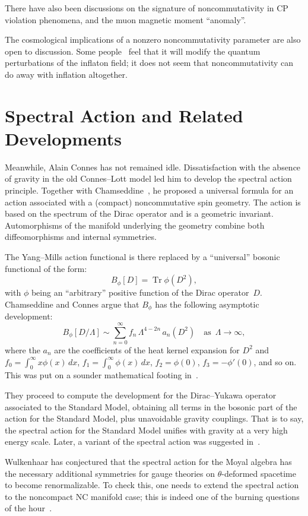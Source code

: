 \documentclass[a4paper,12pt]{article}
\newcommand{\as}{\quad\text{as}\enspace} %
\newcommand{\La}{\Lambda}           %
\DeclareMathOperator{\Tr}{Tr}       %
\newcommand{\1}{\mathbf{1}}         %
\newcommand{\7}{\dagger}            %
\newcommand{\8}{\bullet}            %
\renewcommand{\.}{\cdot}            %
\renewcommand{\:}{\colon}           %
\begin{document}
There have also been discussions on the signature of noncommutativity
in CP violation phenomena, and the muon magnetic moment ``anomaly''.

The cosmological implications of a nonzero noncommutativity parameter
are also open to discussion. Some people~\cite{ChuGS,LizziMMP} feel
that it will modify the quantum perturbations of the inflaton field;
it does not seem that noncommutativity can do away with inflation
altogether.


\section{Spectral Action and Related Developments}

Meanwhile, Alain Connes has not remained idle. Dissatisfaction with
the absence of gravity in the old Connes--Lott model led him to
develop the spectral action principle. Together with
Chamseddine~\cite{ChamseddineCSpec}, he proposed a universal formula
for an action associated with a (compact) noncommutative spin geometry. The
action is based on the spectrum of the Dirac operator and is a
geometric invariant. Automorphisms of the manifold underlying the
geometry combine both diffeomorphisms and internal symmetries.

The Yang--Mills action functional is there replaced by a ``universal''
bosonic functional of the form:
$$
B_\phi[D] = \Tr \phi(D^2),
$$
with $\phi$ being an ``arbitrary'' positive function of the Dirac
operator~$D$. Chamseddine and Connes argue that $B_\phi$ has the
following asymptotic development:
$$
B_\phi[D/\La] \sim \sum_{n=0}^\infty f_n\, \La^{4-2n}\, a_n(D^2)
\as \La \to \infty,
$$
where the $a_n$ are the coefficients of the heat kernel expansion for
$D^2$ and $f_0 = \int_0^\infty x \phi(x) \,dx$,
$f_1 = \int_0^\infty \phi(x) \,dx$, $f_2 = \phi(0)$,
$f_3 = -\phi'(0)$, and so on. This was put on a sounder mathematical
footing in~\cite{Odysseus}.

They proceed to compute the development for the Dirac--Yukawa operator
associated to the Standard Model, obtaining all terms in the bosonic
part of the action for the Standard Model, plus unavoidable gravity
couplings. That is to say, the spectral action for the Standard Model
unifies with gravity at a very high energy scale. Later, a variant of
the spectral action was suggested in~\cite{Zappafrank}.

Wulkenhaar has conjectured that the spectral action for the
Moyal algebra has the necessary additional symmetries for gauge
theories on $\theta$-deformed spacetime to become renormalizable. To
check this, one needs to extend the spectral action to the noncompact
NC manifold case; this is indeed one of the burning questions of
the hour~\cite{Selene}.
\end{document}
